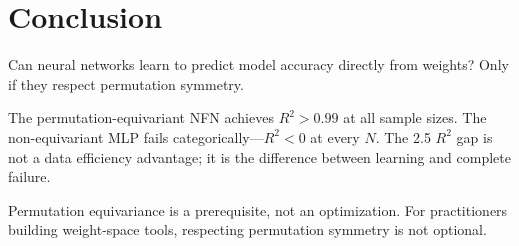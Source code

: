 \section{Conclusion}

Can neural networks learn to predict model accuracy directly from weights? Only if they respect permutation symmetry.

The permutation-equivariant NFN achieves $R^2 > 0.99$ at all sample sizes. The non-equivariant MLP fails categorically---$R^2 < 0$ at every $N$. The 2.5 $R^2$ gap is not a data efficiency advantage; it is the difference between learning and complete failure.

Permutation equivariance is a prerequisite, not an optimization. For practitioners building weight-space tools, respecting permutation symmetry is not optional.
